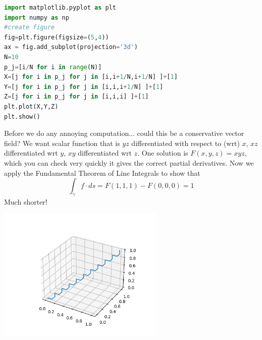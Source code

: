 \documentclass[11pt,openany]{book}
\begin{document}
	\begin{lstlisting}[language=Python]
import matplotlib.pyplot as plt
import numpy as np
#create figure
fig=plt.figure(figsize=(5,4))
ax = fig.add_subplot(projection='3d')
N=10
p_j=[i/N for i in range(N)]
X=[j for i in p_j for j in [i,i+1/N,i+1/N] ]+[1]
Y=[j for i in p_j for j in [i,i,i+1/N] ]+[1]
Z=[j for i in p_j for j in [i,i,i] ]+[1]
plt.plot(X,Y,Z)
plt.show()
	\end{lstlisting}
	Before we do any annoying computation... could this be a conservative vector field? We want scalar function that is $yz$ differentiated with respect to (wrt) $x$, $xz$ differentiated wrt $y$, $xy$ differentiated wrt $z$.
	One solution is $F(x,y,z)=xyz$, which you can check very quickly it gives the correct partial derivatives.
	Now we apply the Fundamental Theorem of Line Integrals to show that
	\[
	\int_{\gamma} f\cdot ds = F(1,1,1) - F(0,0,0) = 1
	\]
	Much shorter!
	\newpage
	
	\includegraphics[width=0.6\textwidth]{staircase.png}
	
\end{document}
